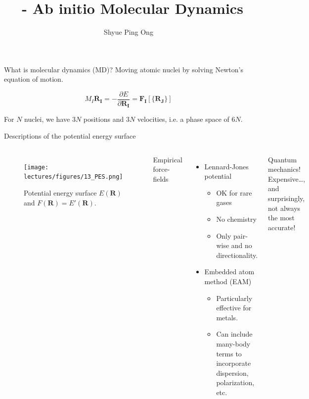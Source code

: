 \documentclass[aspectratio=169]{beamer}
\title[\classname AIMD]{\classname~- Ab initio Molecular Dynamics}
\author{Shyue Ping Ong}
\institute[UCSD]{University of California, San Diego\\
\medskip
}
\date{\classyear} %
\let \vec \mathbf
\begin{document}
    \begin{frame}
        \titlepage %
    \end{frame}


\begin{frame}{What is molecular dynamics (MD)?}
Moving atomic nuclei by solving Newton’s equation of motion.

\begin{equation*}
M_I \ddot{\vec{R_I}} = - \frac{\partial E}{\partial \vec{R_I}} = \vec{F_I}[\{\vec{R_J}\}]
\end{equation*} 

For $N$ nuclei, we have $3N$ positions and $3N$ velocities, i.e. a phase space of $6N$.

\end{frame} 


\begin{frame}{Descriptions of the potential energy surface}

\begin{columns}
\begin{figure}
\centering
    \texttt{[image: lectures/figures/13\_PES.png]}
\caption{Potential energy surface $E(\vec{R})$ and $F(\vec{R}) = E'(\vec{R})$.}
\end{figure} 
Empirical force-fields
\begin{itemize}
    \item Lennard-Jones potential
    \begin{itemize}
    
        \item OK for rare gases
        \item No chemistry
        \item Only pair-wise and no directionality.
    \end{itemize}
    \item Embedded atom method (EAM)
    \begin{itemize}    
        \item Particularly effective for metals.
        \item Can include many-body terms to incorporate dispersion, polarization, etc.
    \end{itemize}
\end{itemize}

Quantum mechanics!
Expensive…, and surprisingly, not always the most accurate!

\end{columns}

\end{frame} 
\end{document}
